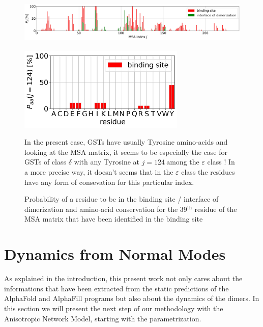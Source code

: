 \begin{figure}[H]
	\label{BS & DI Proba}
	\center\includegraphics[height = 2.75cm]{figures/MSA_Proba.jpg} %
	\begin{minipage}{.48\linewidth}
		\centering
		\includegraphics[height = 4cm]{figures/amino-acid_conservation_BS_j=124.jpg}
	\end{minipage}	
	\begin{minipage}{.48\linewidth}
		In the present case, GSTs have usually Tyrosine amino-acids and looking at the MSA matrix, it seems to be especially the case for GSTs of class $\delta$ with any Tyrosine at $j = 124 ~$among the $\varepsilon$ class ! In a more precise way, it doesn't seems that in the $\varepsilon$ class the residues have any form of consevation for this particular index.
	\end{minipage}	
	\caption{Probability of a residue to be in the binding site / interface of dimerization and amino-acid conservation for the 39$^{\text{th}}$ residue of the MSA matrix that have been identified in the binding site}
\end{figure}
\newpage
\section{Dynamics from Normal Modes}
\noindent As explained in the introduction, this present work not only cares about the informations that have been extracted from the static predictions of the AlphaFold and AlphaFill programs but also about the dynamics of the dimers. In this section we will present the next step of our methodology with the Anisotropic Network Model, starting with the parametrization.

